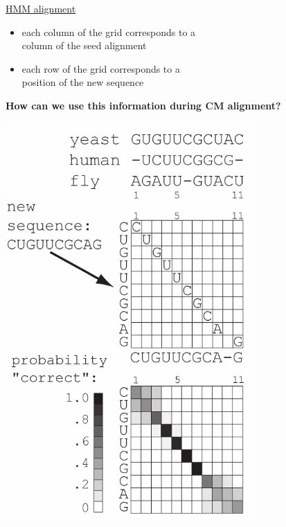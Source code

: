 \documentclass[landscape]{slides}
\begin{document}
\begin{slide}
\begin{minipage}{6in}
\begin{itemize}
\end{itemize}
\small
\hspace{0.3in}
\underline{HMM alignment}%
\begin{itemize}
\item
each column of the grid corresponds to a \\ column
of the seed alignment
\item
each row of the grid corresponds to a \\ position of the new sequence
\end{itemize}
\begin{center}
\normalsize
\textbf{How can we use this information during CM alignment?}
\end{center}
\vspace{1.9in}
\end{minipage}
\begin{minipage}{4in}
\begin{center}
\includegraphics[height=6in]{figs/hmm_alignment2_layer3}
\end{center}
\vspace{1.5in}
\end{minipage}
\end{slide}
\end{document}
